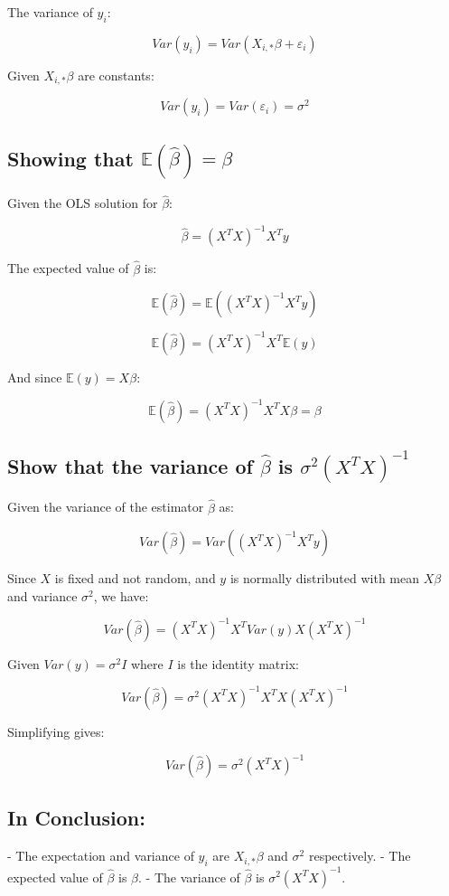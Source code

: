 \documentclass{article}
\begin{document}
The variance of \(y_i\):

\[ Var(y_i) = Var(X_{i, *} \beta + \varepsilon_i) \]

Given \(X_{i, *} \beta\) are constants:

\[ Var(y_i) = Var(\varepsilon_i) = \sigma^2 \]

\subsection*{Showing that \( \mathbb{E}(\hat{\beta}) = \beta \)}

Given the OLS solution for \( \hat{\beta} \):

\[ \hat{\beta} = (X^T X)^{-1} X^T y \]

The expected value of \( \hat{\beta} \) is:

\[ \mathbb{E}(\hat{\beta}) = \mathbb{E}((X^T X)^{-1} X^T y) \]

\[ \mathbb{E}(\hat{\beta}) = (X^T X)^{-1} X^T \mathbb{E}(y) \]

And since \( \mathbb{E}(y) = X \beta \):

\[ \mathbb{E}(\hat{\beta}) = (X^T X)^{-1} X^T X \beta = \beta \]

\subsection*{Show that the variance of \( \hat{\beta} \) is \( \sigma^2 (X^T X)^{-1} \)}

Given the variance of the estimator \( \hat{\beta} \) as:

\[ Var(\hat{\beta}) = Var((X^T X)^{-1} X^T y) \]

Since \(X\) is fixed and not random, and \(y\) is normally distributed with mean \(X \beta\) and variance \( \sigma^2 \), we have:

\[ Var(\hat{\beta}) = (X^T X)^{-1} X^T Var(y) X (X^T X)^{-1} \]

Given \( Var(y) = \sigma^2 I \) where \( I \) is the identity matrix:

\[ Var(\hat{\beta}) = \sigma^2 (X^T X)^{-1} X^T X (X^T X)^{-1} \]

Simplifying gives:

\[ Var(\hat{\beta}) = \sigma^2 (X^T X)^{-1} \]

\subsection*{In Conclusion:}
- The expectation and variance of \(y_i\) are \(X_{i, *} \beta\) and \(\sigma^2\) respectively.
- The expected value of \( \hat{\beta} \) is \( \beta \).
- The variance of \( \hat{\beta} \) is \( \sigma^2 (X^T X)^{-1} \).
\end{document}
